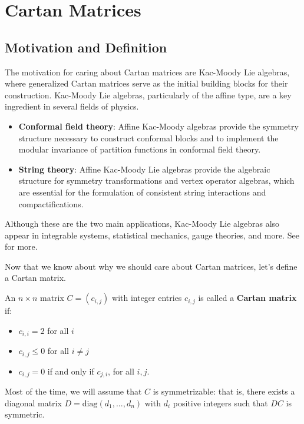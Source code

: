 \newpage 

\section{Cartan Matrices}

\subsection{Motivation and Definition}

The motivation for caring about Cartan matrices are Kac-Moody Lie algebras, where generalized Cartan matrices serve as the initial building blocks for their construction. Kac-Moody Lie algebras, particularly of the affine type, are a key ingredient in several fields of physics. 
\begin{itemize}
    \item \textbf{Conformal field theory}: Affine Kac-Moody algebras provide the symmetry structure necessary to construct conformal blocks and to implement the modular invariance of partition functions in conformal field theory.
    \item \textbf{String theory}: Affine Kac-Moody Lie algebras provide the algebraic structure for symmetry transformations and vertex operator algebras, which are essential for the formulation of consistent string interactions and compactifications.
\end{itemize}
Although these are the two main applications, Kac-Moody Lie algebras also appear in integrable systems, statistical mechanics, gauge theories, and more. See \cite{KMPHYS} for more.

Now that we know about why we should care about Cartan matrices, let's define a Cartan matrix.

\begin{definition}
    An $n\times n$ matrix $C=(c_{i,j})$ with integer entries $c_{i,j}$ is called a \textbf{Cartan matrix} if:
    \begin{itemize}
        \item $c_{i,i}=2$ for all $i$
        \item $c_{i,j}\le 0$ for all $i\neq j$
        \item $c_{i,j}=0$ if and only if $c_{j,i}$, for all $i,j$.
    \end{itemize}
\end{definition}

Most of the time, we will assume that $C$ is symmetrizable: that is, there exists a diagonal matrix $D=\text{diag}(d_1,...,d_n)$ with $d_i$ positive integers such that $DC$ is symmetric.

